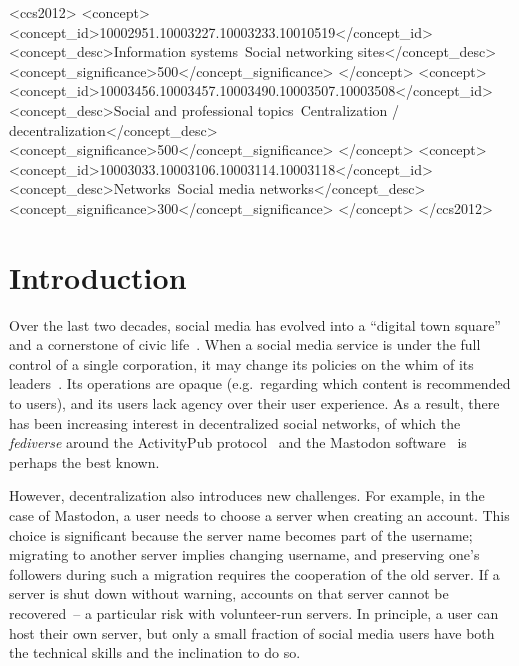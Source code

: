 \documentclass[sigconf]{acmart}
\begin{document}
\begin{CCSXML}
<ccs2012>
   <concept>
       <concept_id>10002951.10003227.10003233.10010519</concept_id>
       <concept_desc>Information systems~Social networking sites</concept_desc>
       <concept_significance>500</concept_significance>
       </concept>
   <concept>
       <concept_id>10003456.10003457.10003490.10003507.10003508</concept_id>
       <concept_desc>Social and professional topics~Centralization / decentralization</concept_desc>
       <concept_significance>500</concept_significance>
       </concept>
   <concept>
       <concept_id>10003033.10003106.10003114.10003118</concept_id>
       <concept_desc>Networks~Social media networks</concept_desc>
       <concept_significance>300</concept_significance>
       </concept>
 </ccs2012>
\end{CCSXML}


\maketitle

\section{Introduction}\label{sec:introduction}

Over the last two decades, social media has evolved into a ``digital town square'' and a cornerstone of civic life~\cite{Barabas:2017}.
When a social media service is under the full control of a single corporation, it may change its policies on the whim of its leaders~\cite{Yeung:2023}.
Its operations are opaque (e.g.\ regarding which content is recommended to users), and its users lack agency over their user experience.
As a result, there has been increasing interest in decentralized social networks, of which the \emph{fediverse} around the ActivityPub protocol~\cite{ActivityPub} and the Mastodon software~\cite{Mastodon} is perhaps the best known.

However, decentralization also introduces new challenges.
For example, in the case of Mastodon, a user needs to choose a server when creating an account.
This choice is significant because the server name becomes part of the username; migrating to another server implies changing username, and preserving one's followers during such a migration requires the cooperation of the old server.
If a server is shut down without warning, accounts on that server cannot be recovered~-- a particular risk with volunteer-run servers.
In principle, a user can host their own server, but only a small fraction of social media users have both the technical skills and the inclination to do so.
\end{document}
